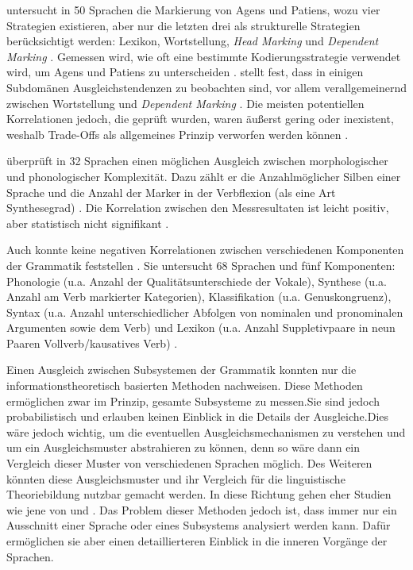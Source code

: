 \citet{Sinnemäki2008} untersucht in 50 Sprachen die Markierung von Agens und Patiens, wozu vier Strategien existieren, aber nur die letzten drei als strukturelle Strategien berücksichtigt werden: Lexikon, Wortstellung, \textit{Head Marking} und \textit{Dependent Marking} \citep[68]{Sinnemäki2008}. Gemessen wird, wie oft eine bestimmte Kodierungsstrategie verwendet wird, um Agens und Patiens zu unterscheiden \citep[72]{Sinnemäki2008}. \citet{Sinnemäki2008} stellt fest, dass in einigen Subdomänen Ausgleichstendenzen zu beobachten sind, vor allem verallgemeinernd zwischen Wortstellung und \textit{Dependent Marking} \citep[84--85]{Sinnemäki2008}. Die meisten potentiellen Korrelationen jedoch, die geprüft wurden, waren äußerst gering oder inexistent, weshalb Trade-Offs als allgemeines Prinzip verworfen werden können \citep[84]{Sinnemäki2008}.

\citet{Shosted2006} überprüft in 32 Sprachen einen möglichen Ausgleich zwischen morphologischer und phonologischer Komplexität. Dazu zählt er die Anzahl\linebreak möglicher Silben einer Sprache und die Anzahl der Marker in der Verbflexion (als eine Art Synthesegrad) \citep[9–17]{Shosted2006}. Die Korrelation zwischen den Messresultaten ist leicht positiv, aber statistisch nicht signifikant \citep[1]{Shosted2006}.

Auch \citet{Nichols2009} konnte keine negativen Korrelationen zwischen verschiedenen Komponenten der Grammatik feststellen \citep[119]{Nichols2009}. Sie untersucht 68 Sprachen und fünf Komponenten: Phonologie (u.a. Anzahl der Qualitätsunterschiede der Vokale), Synthese (u.a. Anzahl am Verb markierter Kategorien), Klassifikation (u.a. Genuskongruenz), Syntax (u.a. Anzahl unterschiedlicher Abfolgen von nominalen und pronominalen Argumenten sowie dem Verb) und Lexikon (u.a. Anzahl Suppletivpaare in neun Paaren Vollverb/kausatives Verb) \citep[113]{Nichols2009}.

Einen Ausgleich zwischen Subsystemen der Grammatik konnten nur die informationstheoretisch basierten Methoden nachweisen. Diese Methoden ermöglichen zwar im Prinzip, gesamte Subsysteme zu messen.\largerpage Sie sind jedoch probabilistisch und erlauben keinen Einblick in die Details der Ausgleiche.\largerpage Dies wäre jedoch wichtig, um die eventuellen Ausgleichsmechanismen zu verstehen und um ein Ausgleichsmuster abstrahieren zu können, denn so wäre dann ein Vergleich dieser Muster von verschiedenen Sprachen möglich. Des Weiteren könnten diese Ausgleichsmuster und ihr Vergleich für die linguistische Theoriebildung nutzbar gemacht werden. In diese Richtung gehen eher Studien wie jene von \citet{Sinnemäki2008} und \citet{Nichols2009}. Das Problem dieser Methoden jedoch ist, dass immer nur ein Ausschnitt einer Sprache oder eines Subsystems analysiert werden kann. Dafür ermöglichen sie aber einen detaillierteren Einblick in die inneren Vorgänge der Sprachen.

